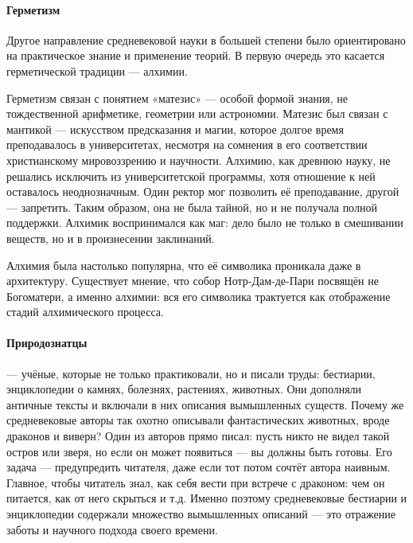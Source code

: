 \paragraph{Герметизм}

Другое направление средневековой науки в большей степени было ориентировано на практическое знание и применение теорий. В первую очередь это касается герметической традиции --- алхимии.

Герметизм связан с понятием «матезис» --- особой формой знания, не тождественной арифметике, геометрии или астрономии. Матезис был связан с мантикой --- искусством предсказания и магии, которое долгое время преподавалось в университетах, несмотря на сомнения в его соответствии христианскому мировоззрению и научности. Алхимию, как древнюю науку, не решались исключить из университетской программы, хотя отношение к ней оставалось неоднозначным. Один ректор мог позволить её преподавание, другой --- запретить. Таким образом, она не была тайной, но и не получала полной поддержки. Алхимик воспринимался как маг: дело было не только в смешивании веществ, но и в произнесении заклинаний. 

Алхимия была настолько популярна, что её символика проникала даже в архитектуру. Существует мнение, что собор Нотр-Дам-де-Пари посвящён не Богоматери, а именно алхимии: вся его символика трактуется как отображение стадий алхимического процесса.

\paragraph{Природознатцы} --- учёные, которые не только практиковали, но и писали труды: бестиарии, энциклопедии о камнях, болезнях, растениях, животных. Они дополняли античные тексты и включали в них описания вымышленных существ. Почему же средневековые авторы так охотно описывали фантастических животных, вроде драконов и виверн? Один из авторов прямо писал: пусть никто не видел такой остров или зверя, но если он может появиться --- вы должны быть готовы. Его задача --- предупредить читателя, даже если тот потом сочтёт автора наивным. Главное, чтобы читатель знал, как себя вести при встрече с драконом: чем он питается, как от него скрыться и т.д. Именно поэтому средневековые бестиарии и энциклопедии содержали множество вымышленных описаний --- это отражение заботы и научного подхода своего времени.

